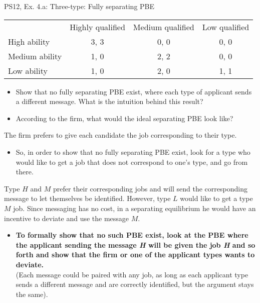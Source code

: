 \begin{frame}{PS12, Ex. 4.a: Three-type: Fully separating PBE}
    \begin{table}
      \begin{tabular}{l|c|c|c|}
          \multicolumn{1}{c}{} & \multicolumn{1}{c}{Highly qualified} & \multicolumn{1}{c}{Medium qualified} & \multicolumn{1}{c}{Low qualified} \\\cline{2-4}
          High ability   & 3, 3 & 0, 0 & 0, 0 \\\cline{2-4}
          Medium ability & 1, 0 & 2, 2 & 0, 0 \\\cline{2-4}
          Low ability    & 1, 0 & 2, 0 & 1, 1 \\\cline{2-4}
      \end{tabular}
    \end{table}\vspace{-8pt}
    \begin{itemize}
      \item[(a)] Show that no fully separating PBE exist, where each type of applicant sends a different message. What is the intuition behind this result?
      \item[Step 1:] According to the firm, what would the ideal separating PBE look like?
    \end{itemize}\vspace{-6pt}
    The firm prefers to give each candidate the job corresponding to their type.\vspace{-4pt}
    \begin{itemize}
      \item[Step 2:] So, in order to show that no fully separating PBE exist, look for a type who would like to get a job that does not correspond to one's type, and go from there.
    \end{itemize}\vspace{-6pt}
    Type $H$ and $M$ prefer their corresponding jobs and will send the corresponding message to let themselves be identified. However, type $L$ would like to get a type $M$ job. Since messaging has no cost, in a separating equilibrium he would have an incentive to deviate and use the message $M$.\vspace{-4pt}
    \begin{itemize}
      \item[Step 3:] \textbf{To formally show that no such PBE exist, look at the PBE where the applicant sending the message \textit{H} will be given the job \textit{H} and so forth and show that the firm or one of the applicant types wants to deviate.}\\
      (Each message could be paired with any job, as long as each applicant type sends a different message and are correctly identified, but the argument stays the same).
    \end{itemize}
    \vfill\null
\end{frame}
